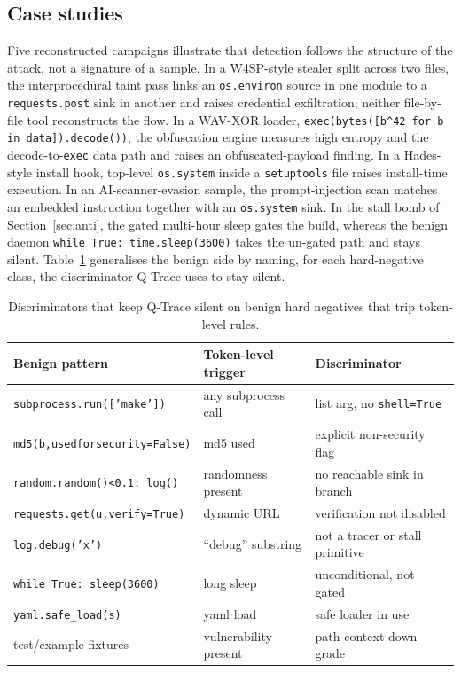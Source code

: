 \documentclass[runningheads]{llncs}
\begin{document}
\subsection{Case studies}
Five reconstructed campaigns illustrate that detection follows the structure of
the attack, not a signature of a sample. In a W4SP-style stealer split across two
files, the interprocedural taint pass links an \texttt{os.environ} source in one
module to a \texttt{requests.post} sink in another and raises credential
exfiltration; neither file-by-file tool reconstructs the flow. In a WAV-XOR
loader, \texttt{exec(bytes([b\^{}42 for b in data]).decode())}, the obfuscation
engine measures high entropy and the decode-to-\texttt{exec} data path and raises
an obfuscated-payload finding. In a Hades-style install hook, top-level
\texttt{os.system} inside a \texttt{setuptools} file raises install-time
execution. In an AI-scanner-evasion sample, the prompt-injection scan matches an
embedded instruction together with an \texttt{os.system} sink. In the stall bomb
of Section~\ref{sec:anti}, the gated multi-hour sleep gates the build, whereas the
benign daemon \texttt{while True: time.sleep(3600)} takes the un-gated path and
stays silent. Table~\ref{tab:fptax} generalises the benign side by naming, for
each hard-negative class, the discriminator Q-Trace uses to stay silent.

\begin{table}[t]
\centering
\caption{Discriminators that keep Q-Trace silent on benign hard negatives that
trip token-level rules.}
\label{tab:fptax}
\footnotesize
\begin{tabular}{@{}lll@{}}
\toprule
\textbf{Benign pattern} & \textbf{Token-level trigger} & \textbf{Discriminator}\\
\midrule
\texttt{subprocess.run(['make'])} & any subprocess call & list arg, no \texttt{shell=True}\\
\texttt{md5(b,usedforsecurity=False)} & md5 used & explicit non-security flag\\
\texttt{random.random()<0.1: log()} & randomness present & no reachable sink in branch\\
\texttt{requests.get(u,verify=True)} & dynamic URL & verification not disabled\\
\texttt{log.debug('x')} & ``debug'' substring & not a tracer or stall primitive\\
\texttt{while True: sleep(3600)} & long sleep & unconditional, not gated\\
\texttt{yaml.safe\_load(s)} & yaml load & safe loader in use\\
test/example fixtures & vulnerability present & path-context down-grade\\
\bottomrule
\end{tabular}
\end{table}
\end{document}
